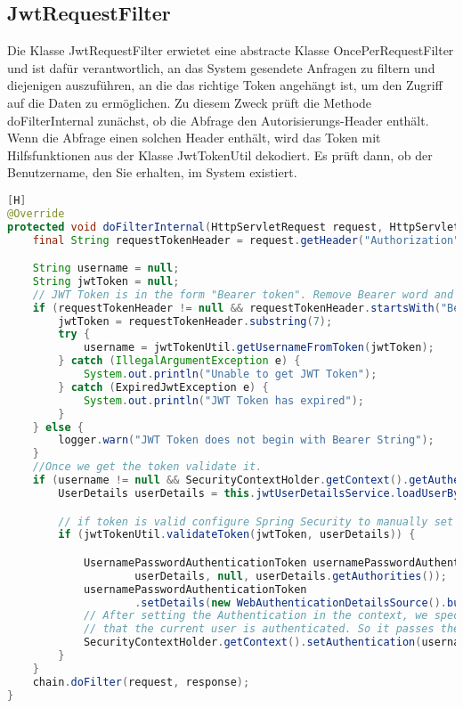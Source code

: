 \subsection{JwtRequestFilter}
Die Klasse JwtRequestFilter erwietet eine abstracte Klasse OncePerRequestFilter und ist dafür verantwortlich, an das System gesendete Anfragen zu filtern und diejenigen auszuführen, an die das richtige Token angehängt ist, um den Zugriff auf die Daten zu ermöglichen. Zu diesem Zweck prüft die Methode doFilterInternal zunächst, ob die Abfrage den Autorisierungs-Header enthält. Wenn die Abfrage einen solchen Header enthält, wird das Token mit Hilfsfunktionen aus der Klasse JwtTokenUtil dekodiert. Es prüft dann, ob der Benutzername, den Sie erhalten, im System existiert.
\begin{lstlisting}[language=JAVA,caption=JwtRequestFilter.java][H]
@Override
protected void doFilterInternal(HttpServletRequest request, HttpServletResponse response, FilterChain chain) throws ServletException, IOException {
    final String requestTokenHeader = request.getHeader("Authorization");

    String username = null;
    String jwtToken = null;
    // JWT Token is in the form "Bearer token". Remove Bearer word and get only the Token
    if (requestTokenHeader != null && requestTokenHeader.startsWith("Bearer ")) {
        jwtToken = requestTokenHeader.substring(7);
        try {
            username = jwtTokenUtil.getUsernameFromToken(jwtToken);
        } catch (IllegalArgumentException e) {
            System.out.println("Unable to get JWT Token");
        } catch (ExpiredJwtException e) {
            System.out.println("JWT Token has expired");
        }
    } else {
        logger.warn("JWT Token does not begin with Bearer String");
    }
    //Once we get the token validate it.
    if (username != null && SecurityContextHolder.getContext().getAuthentication() == null) {
        UserDetails userDetails = this.jwtUserDetailsService.loadUserByUsername(username);

        // if token is valid configure Spring Security to manually set authentication
        if (jwtTokenUtil.validateToken(jwtToken, userDetails)) {

            UsernamePasswordAuthenticationToken usernamePasswordAuthenticationToken = new UsernamePasswordAuthenticationToken(
                    userDetails, null, userDetails.getAuthorities());
            usernamePasswordAuthenticationToken
                    .setDetails(new WebAuthenticationDetailsSource().buildDetails(request));
            // After setting the Authentication in the context, we specify
            // that the current user is authenticated. So it passes the Spring Security Configurations successfully.
            SecurityContextHolder.getContext().setAuthentication(usernamePasswordAuthenticationToken);
        }
    }
    chain.doFilter(request, response);
}
\end{lstlisting}

